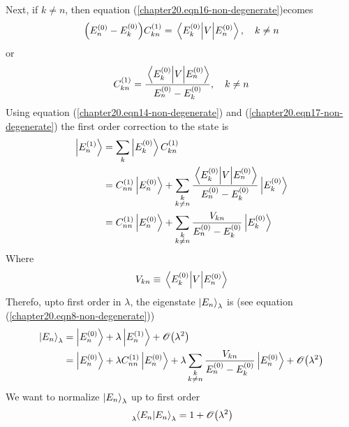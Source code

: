 Next, if $k \neq n$, then equation (\ref{chapter20.eqn16-non-degenerate})ecomes
\begin{equation}
\qty(E_n^{(0)} -  E_{k}^{(0)}) C_{k n}^{(1)} = \matrixel{E_k^{(0)}} {V} {E_n^{(0)}} , \quad k \neq n
\end{equation}
or
\begin{equation}
	C_{k n}^{(1)} =  \frac{\matrixel{E_k^{(0)}} {V}{E_n^{(0)}}}{E_n^{(0)} -  E_{k}^{(0)}} , \quad k \neq n
	\label{chapter20.eqn17-non-degenerate}
\end{equation}
Using equation (\ref{chapter20.eqn14-non-degenerate}) and (\ref{chapter20.eqn17-non-degenerate}) the first order correction to the state is
\begin{align}
	\ket{E_{n}^{(1)}} 
	&= \sum_{k} \ket{E_k^{(0)}} C^{(1)}_{k n} \\
	\label{chapter20.eqn18-non-degenerate}
	&= C^{(1)}_{n n} \ket{E_{n}^{(0)}}  + \sum_{\substack{k \\ k \neq n}} \frac{\matrixel{E_k^{(0)}} {V}{E_n^{(0)}}}{E_n^{(0)} -  E_{k}^{(0)}} \ket{E_k^{(0)}} \\
	\label{chapter20.eqn19-non-degenerate}
	&= C^{(1)}_{n n} \ket{E_{n}^{(0)}}  + \sum_{\substack{k \\ k \neq n}} \frac{V_{k n}}{E_n^{(0)} -  E_{k}^{(0)}} \ket{E_k^{(0)}}
\end{align}
	Where
	\begin{equation}
		V_{k n} \equiv \matrixel{E_k^{(0)}} {V} {E_n^{(0)}}
	\end{equation}
	Therefo, upto first order in $\lambda$, the eigenstate $\ket{E_{n}}_\lambda$ is (see equation (\ref{chapter20.eqn8-non-degenerate}))
	\begin{align}
		\ket{E_n}_\lambda 
		&= \ket{E_n^{(0)}} + \lambda \ket{E_n^{(1)}} + \order{\lambda^2} \\
		\label{chapter20.eqn20-non-degenerate}
		&= \ket{E_n^{(0)}} + \lambda C^{(1)}_{n n} \ket{E_n^{(0)}} + \lambda \sum_{\substack{k \\ k \neq n}} \frac{V_{k n}}{E_n^{(0)} -  E_{k}^{(0)}} \ket{E_n^{(0)}} + \order{\lambda^2}
	\end{align}
	We want to normalize $\ket{E_n}_\lambda$ up to first order 
	\begin{equation}
		\tensor*[_{\lambda}]{\braket{E_n}{E_n}}{_{\lambda}} = 1 + \order{\lambda^2}
	\end{equation}
